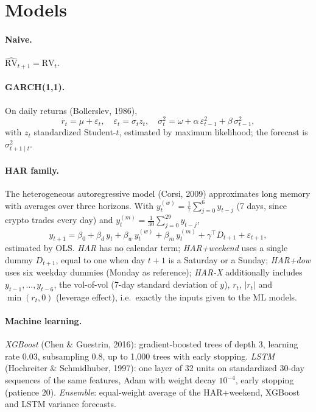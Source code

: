 \documentclass[11pt,a4paper]{article}
\newcommand{\RV}{\mathrm{RV}}
\begin{document}
\section{Models}

\paragraph{Naive.} $\widehat{\RV}_{t+1}=\RV_t$.

\paragraph{GARCH(1,1).} On daily returns (Bollerslev, 1986),
\begin{equation}
r_t=\mu+\varepsilon_t,\quad \varepsilon_t=\sigma_t z_t,\quad \sigma_t^2=\omega+\alpha\,\varepsilon_{t-1}^2+\beta\,\sigma_{t-1}^2,
\end{equation}
with $z_t$ standardized Student-$t$, estimated by maximum likelihood; the forecast is $\sigma^2_{t+1\mid t}$.

\paragraph{HAR family.} The heterogeneous autoregressive model (Corsi, 2009) approximates long memory with averages over three horizons.
With $y^{(w)}_t=\frac17\sum_{j=0}^{6}y_{t-j}$ (7 days, since crypto trades every day) and $y^{(m)}_t=\frac1{30}\sum_{j=0}^{29}y_{t-j}$,
\begin{equation}
y_{t+1}=\beta_0+\beta_d\,y_t+\beta_w\,y^{(w)}_t+\beta_m\,y^{(m)}_t+\gamma^{\top}D_{t+1}+\varepsilon_{t+1},
\end{equation}
estimated by OLS. \emph{HAR} has no calendar term; \emph{HAR+weekend} uses a single dummy $D_{t+1}$, equal to one when day $t+1$ is a Saturday or a Sunday;
\emph{HAR+dow} uses six weekday dummies (Monday as reference); \emph{HAR-X} additionally includes $y_{t-1},\dots,y_{t-6}$, the vol-of-vol
(7-day standard deviation of $y$), $r_t$, $|r_t|$ and $\min(r_t,0)$ (leverage effect), i.e.\ exactly the inputs given to the ML models.

\paragraph{Machine learning.} \emph{XGBoost} (Chen \& Guestrin, 2016): gradient-boosted trees of depth 3, learning rate $0.03$,
subsampling $0.8$, up to 1{,}000 trees with early stopping. \emph{LSTM} (Hochreiter \& Schmidhuber, 1997): one layer of 32 units on standardized
30-day sequences of the same features, Adam with weight decay $10^{-4}$, early stopping (patience 20).
\emph{Ensemble}: equal-weight average of the HAR+weekend, XGBoost and LSTM variance forecasts.
\end{document}
